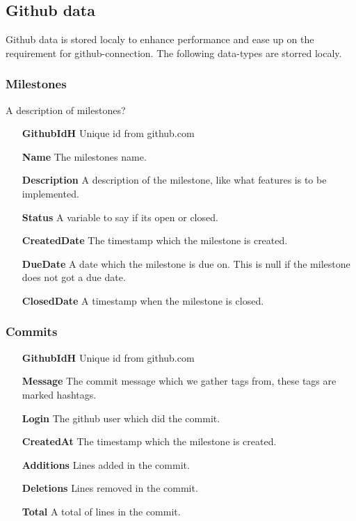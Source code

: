 \subsection{Github data}
Github data is stored localy to enhance performance and ease up on the requirement for github-connection. The following data-types are storred localy.

\subsubsection*{Milestones}
A description of milestones?
\vspace{0.5cm}
\begin{itemize}
    \item[\textbf{GithubIdH}]{Unique id from github.com}
    \item[\textbf{Name}]{The milestones name.}
    \item[\textbf{Description}]{A description of the milestone, like what features is to be implemented.}
    \item[\textbf{Status}]{A variable to say if its open or closed.}
    \item[\textbf{CreatedDate}]{The timestamp which the milestone is created.}
    \item[\textbf{DueDate}]{A date which the milestone is due on. This is null if the milestone does not got a due date.}
    \item[\textbf{ClosedDate}]{A timestamp when the milestone is closed.}
\end{itemize}
\vspace{0.5cm}

\subsubsection*{Commits}
\vspace{0.5cm}
\begin{itemize}
    \item[\textbf{GithubIdH}]{Unique id from github.com}
    \item[\textbf{Message}]{The commit message which we gather tags from, these tags are marked hashtags.}
    \item[\textbf{Login}]{The github user which did the commit.}
    \item[\textbf{CreatedAt}]{The timestamp which the milestone is created.}
    \item[\textbf{Additions}]{Lines added in the commit.}
    \item[\textbf{Deletions}]{Lines removed in the commit.}
    \item[\textbf{Total}]{A total of lines in the commit.}
\end{itemize}
\vspace{0.5cm}

